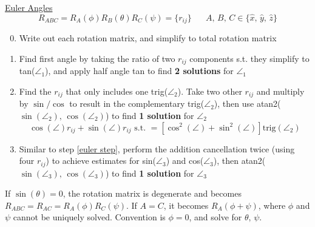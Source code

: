 \documentclass[twocolumn, 12pt]{article}    %
\begin{document}
\noindent\underline{Euler Angles}
\begin{equation*}
    R_{ABC} = R_A(\phi) R_B(\theta)R_C(\psi) = \{r_{ij}\} \hspace{20pt} A,\, B,\, C \in \{\hat{x},\, \hat{y},\, \hat{z}\}
\end{equation*}
\begin{enumerate}
    \setcounter{enumi}{-1} 
    \item Write out each rotation matrix, and simplify to total rotation matrix 
    \item Find first angle by taking the ratio of two \(r_{ij}\) components s.t. they simplify to tan(\(\angle_1\)), and apply half angle tan to find \textbf{2 solutions} for \(\angle_1\)
    \item Find the \(r_{ij}\) that only includes one trig(\(\angle_2\)). Take two other \(r_{ij}\) and multiply by \(\sin/\cos\) to result in the complementary trig(\(\angle_2\)), then use atan2(\(\sin(\angle_2),\, \cos(\angle_2)\)) to find \textbf{1 solution} for \(\angle_2\) \label{euler step}
    \begin{equation*}
        \cos(\angle) r_{ij} + \sin(\angle)r_{ij} \text{ s.t. } = [\cos^2(\angle) + \sin^2(\angle)]\text{trig}(\angle_2)
    \end{equation*}
    \item Similar to step \ref{euler step}, perform the addition cancellation twice (using four \(r_{ij}\)) to achieve estimates for sin(\(\angle_3\)) and cos(\(\angle_3\)), then atan2(\(\sin(\angle_3),\, \cos(\angle_3)\)) to find \textbf{1 solution} for \(\angle_3\)
\end{enumerate}
If \(\sin(\theta)=0\), the rotation matrix is degenerate and becomes \(R_{ABC} = R_{AC}=R_A(\phi)R_C(\psi)\). If \(A=C\), it becomes \(R_A(\phi+\psi)\), where \(\phi\) and \(\psi\) cannot be uniquely solved. Convention is \(\phi=0\), and solve for \(\theta,\, \psi\).
\end{document}
